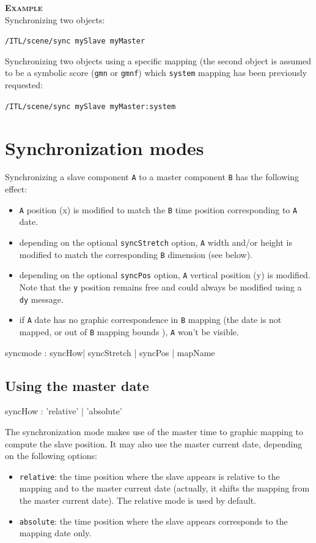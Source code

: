 \documentclass[a4paper,twoside]{report}
\newcommand{\sublevel}[1]	{\section{#1}}
\newcommand{\subsublevel}[1]	{\subsection{#1}}
\newcommand{\OSC}[1]		{\texttt{#1}}
\newcommand{\values}[1]	{\texttt{#1}}
\newcommand{\example}		{\textbf{\hspace{-1.5cm}\textbf{\textsc{Example }}}}
\newcommand{\sample}	[1]			{\vspace{-2mm}\begin{center}\colorbox{mygrey}{
								\begin{minipage}[t]{0.9\columnwidth} 
								{\small \texttt{#1}}
								\end{minipage}}\end{center}}
\begin{document}
\example \\
Synchronizing two objects:
\sample{/ITL/scene/sync mySlave myMaster}

Synchronizing two objects using a specific mapping (the second object is assumed to be a symbolic score (\OSC{gmn} or \OSC{gmnf}) which \OSC{system} mapping has been previously requested:
\sample{/ITL/scene/sync mySlave myMaster:system}

\sublevel{Synchronization modes}\label{syncmode}

Synchronizing a slave component \values{A} to a master component \values{B} has the following effect:
\begin{itemize}
\item \values{A} position (x) is modified to match the \values{B} time position corresponding to \values{A} date.
\item depending on the optional \OSC{syncStretch} option, \values{A} width and/or height is modified to match the  corresponding \values{B} dimension (see below).
\item depending on the optional \OSC{syncPos} option, \values{A} vertical position (y) is modified. Note that the \OSC{y} position remains free and could always be modified using a \OSC{dy} message.
\item if \values{A} date has no graphic correspondence in \values{B} mapping (the date is not mapped, or out of \values{B} mapping bounds ), \values{A} won't be visible.
\end{itemize}

\begin{rail}
syncmode : syncHow| syncStretch | syncPos | mapName
\end{rail}

\subsublevel{Using the master date}
\begin{rail}
syncHow : 'relative' | 'absolute'
\end{rail}

The synchronization mode makes use of the master time to graphic mapping to compute the slave position. It may also use the master current date, depending on the following options:
\begin{itemize}
\item \OSC{relative}: the time position where the slave appears is relative to the mapping and to the master current date (actually, it shifts the mapping from the master current date). The relative mode is used by default.
\item \OSC{absolute}: the time position where the slave appears corresponds to the mapping date only.
\end{itemize}
\end{document}
